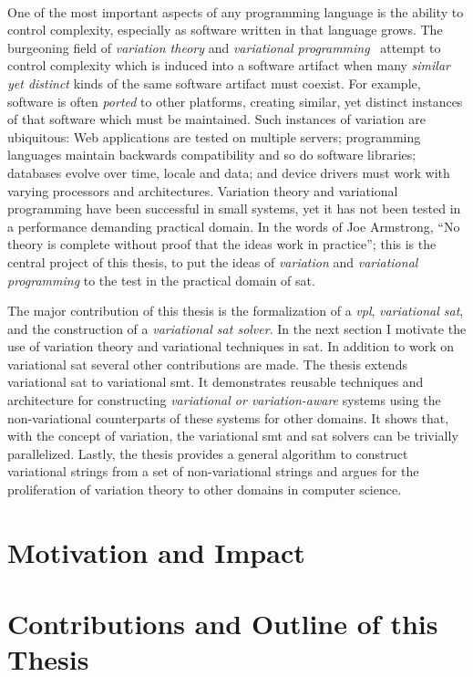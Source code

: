 ~\label{chapter:introduction}%

One of the most important aspects of any programming language is the ability to
control complexity, especially as software written in that language grows. The
burgeoning field of \emph{variation theory} and \emph{variational
  programming}~\cite{EW11gttse,EW11tosem,HW16fosd,CEW16ecoop,Walk14onward}
attempt to control complexity which is induced into a software artifact when
many \emph{similar yet distinct} kinds of the same software artifact must
coexist. For example, software is often \emph{ported} to other platforms,
creating similar, yet distinct instances of that software which must be
maintained. Such instances of variation are ubiquitous: Web applications are
tested on multiple servers; programming languages maintain backwards
compatibility and so do software libraries; databases evolve over time, locale
and data; and device drivers must work with varying processors and
architectures. Variation theory and variational programming have been successful
in small systems, yet it has
not been tested in a performance demanding practical domain. In the words of Joe
Armstrong\cite{armstrongThesis}, ``No theory is complete without proof that the
ideas work in practice''; this is the central project of this thesis, to put the
ideas of \emph{variation} and \emph{variational programming} to the test in the
practical domain of \ac{sat}.

The major contribution of this thesis is the formalization of a \emph{\ac{vpl}},
\emph{variational \acl{sat}}, and the construction of a \emph{variational
  \ac{sat} solver}. In the next section I motivate the use of variation theory
and variational techniques in \acl{sat}. In addition to work on variational
\ac{sat} several other contributions are made. The thesis extends variational
\acl{sat} to variational \ac{smt}. It demonstrates reusable techniques and
architecture for constructing \emph{variational or variation-aware} systems
using the non-variational counterparts of these systems for other domains. It
shows that, with the concept of variation, the variational \ac{smt} and \ac{sat}
solvers can be trivially parallelized. Lastly, the thesis provides a general
algorithm to construct variational strings from a set of non-variational strings
and argues for the proliferation of variation theory to other domains in
computer science.

\section{Motivation and Impact}


\section{Contributions and Outline of this Thesis}


